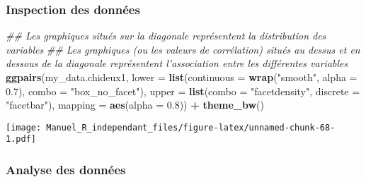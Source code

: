 \documentclass[
]{book}
\newenvironment{Shaded}{\begin{snugshade}}{\end{snugshade}}
\newcommand{\CommentTok}[1]{\textcolor[rgb]{0.56,0.35,0.01}{\textit{#1}}}
\newcommand{\DataTypeTok}[1]{\textcolor[rgb]{0.13,0.29,0.53}{#1}}
\newcommand{\FloatTok}[1]{\textcolor[rgb]{0.00,0.00,0.81}{#1}}
\newcommand{\KeywordTok}[1]{\textcolor[rgb]{0.13,0.29,0.53}{\textbf{#1}}}
\newcommand{\NormalTok}[1]{#1}
\newcommand{\OperatorTok}[1]{\textcolor[rgb]{0.81,0.36,0.00}{\textbf{#1}}}
\newcommand{\StringTok}[1]{\textcolor[rgb]{0.31,0.60,0.02}{#1}}
\begin{document}
\hypertarget{inspection-des-donnuxe9es-6}{%
\subsubsection{Inspection des données}\label{inspection-des-donnuxe9es-6}}

\begin{Shaded}
\begin{Highlighting}[]
\CommentTok{## Les graphiques situés sur la diagonale représentent la distribution des variables}
\CommentTok{## Les graphiques (ou les valeurs de corrélation) situés au dessus et en dessous de la diagonale représentent l'association entre les différentes variables}
\KeywordTok{ggpairs}\NormalTok{(my_data.chideux1,}
        \DataTypeTok{lower =} \KeywordTok{list}\NormalTok{(}\DataTypeTok{continuous =} \KeywordTok{wrap}\NormalTok{(}\StringTok{"smooth"}\NormalTok{, }\DataTypeTok{alpha =} \FloatTok{0.7}\NormalTok{), }\DataTypeTok{combo =} \StringTok{"box_no_facet"}\NormalTok{),}
        \DataTypeTok{upper =} \KeywordTok{list}\NormalTok{(}\DataTypeTok{combo =} \StringTok{"facetdensity"}\NormalTok{, }\DataTypeTok{discrete =} \StringTok{"facetbar"}\NormalTok{), }
        \DataTypeTok{mapping =} \KeywordTok{aes}\NormalTok{(}\DataTypeTok{alpha =} \FloatTok{0.8}\NormalTok{)) }\OperatorTok{+}\StringTok{ }\KeywordTok{theme_bw}\NormalTok{()}
\end{Highlighting}
\end{Shaded}

\texttt{[image: Manuel\_R\_independant\_files/figure-latex/unnamed-chunk-68-1.pdf]}

\hypertarget{analyse-des-donnuxe9es-7}{%
\subsubsection{Analyse des données}\label{analyse-des-donnuxe9es-7}}
\end{document}
